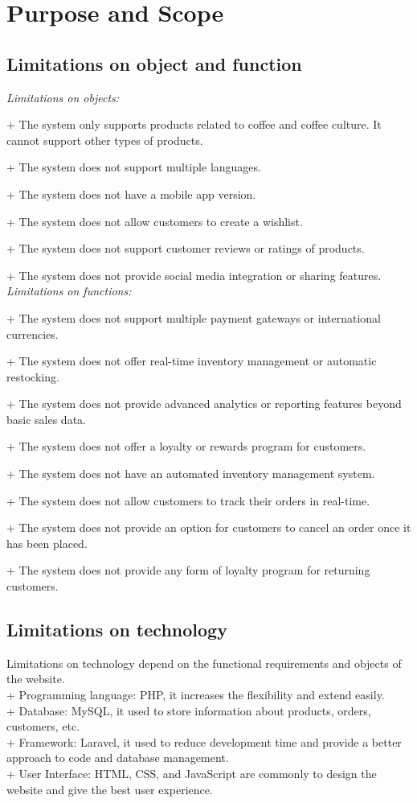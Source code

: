 \section{Purpose and Scope} %

\subsection{Limitations on object and function} %
\textit{Limitations on objects:}

+ The system only supports products related to coffee and coffee culture. It cannot support other types of products.

+ The system does not support multiple languages.

+ The system does not have a mobile app version.

+ The system does not allow customers to create a wishlist.

+ The system does not support customer reviews or ratings of products.

+ The system does not provide social media integration or sharing features.\\
\textit{ Limitations on functions:}

+ The system does not support multiple payment gateways or international currencies.

+ The system does not offer real-time inventory management or automatic restocking.

+ The system does not provide advanced analytics or reporting features beyond basic sales data.

+ The system does not offer a loyalty or rewards program for customers.

+ The system does not have an automated inventory management system.

+ The system does not allow customers to track their orders in real-time.

+ The system does not provide an option for customers to cancel an order once it has been placed.

+ The system does not provide any form of loyalty program for returning customers.
\subsection{Limitations on technology} %
Limitations on technology depend on the functional requirements and objects of the website. \\
+ Programming language: PHP, it increases the flexibility and extend easily.\\
+ Database: MySQL, it used to store information about products, orders, customers, etc.\\
+ Framework: Laravel, it used to reduce development time and provide a better approach to code and database management.\\
+ User Interface: HTML, CSS, and JavaScript are commonly to design the website and give the best user experience.

